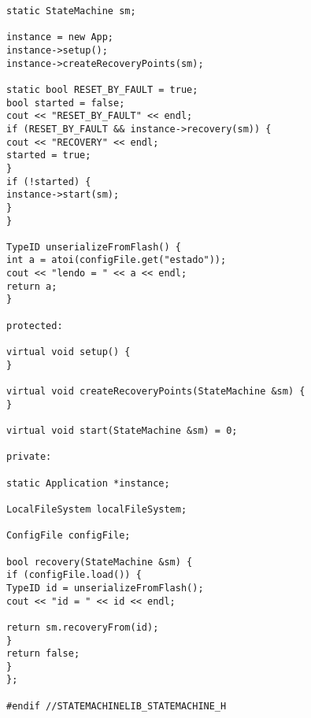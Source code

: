 \begin{lstlisting}
static StateMachine sm;

instance = new App;
instance->setup();
instance->createRecoveryPoints(sm);

static bool RESET_BY_FAULT = true;
bool started = false;
cout << "RESET_BY_FAULT" << endl;
if (RESET_BY_FAULT && instance->recovery(sm)) {
cout << "RECOVERY" << endl;
started = true;
}
if (!started) {
instance->start(sm);
}
}

TypeID unserializeFromFlash() {
int a = atoi(configFile.get("estado"));
cout << "lendo = " << a << endl;
return a;
}

protected:

virtual void setup() {
}

virtual void createRecoveryPoints(StateMachine &sm) {
}

virtual void start(StateMachine &sm) = 0;

private:

static Application *instance;

LocalFileSystem localFileSystem;

ConfigFile configFile;

bool recovery(StateMachine &sm) {
if (configFile.load()) {
TypeID id = unserializeFromFlash();
cout << "id = " << id << endl;

return sm.recoveryFrom(id);
}
return false;
}
};

#endif //STATEMACHINELIB_STATEMACHINE_H
\end{lstlisting}

